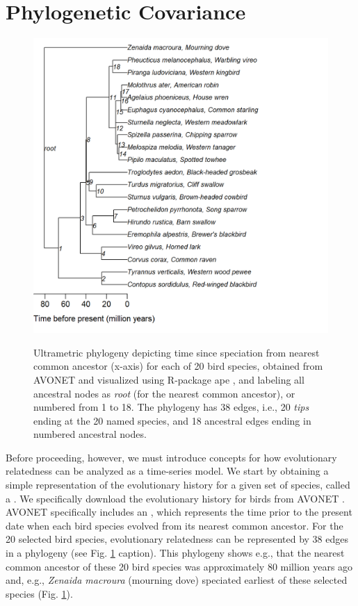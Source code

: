 \section{Phylogenetic Covariance} \label{sec:Chap11_phylogenetic_covariance}

\begin{figure}[!ht]
    \caption[Phylogeny for 20 western US birds]{Ultrametric phylogeny depicting time since speciation from nearest common ancestor (x-axis) for each of 20 bird species, obtained from AVONET \cite{tobias_avonet_2022} and visualized using R-package \colorbox{backcolour}{ape} \cite{paradis_ape_2019}, and labeling all ancestral nodes as \textit{root} (for the nearest common ancestor), or numbered from 1 to 18.  The phylogeny has 38 edges, i.e., 20 \textit{tips} ending at the 20 named species, and 18 ancestral edges ending in numbered ancestral nodes.}
    \includegraphics[width=5.5in]{Chap_11/Phylogeny.png}
    \label{fig:Chap11_phylogeny}
\end{figure}

Before proceeding, however, we must introduce concepts for how evolutionary relatedness can be analyzed as a time-series model.  We start by obtaining a simple representation of the evolutionary history for a given set of species, called a .  We specifically download the evolutionary history for birds from AVONET \cite{hackett_phylogenomic_2008,tobias_avonet_2022}.  AVONET specifically includes an , which represents the time prior to the present date when each bird species evolved from its nearest common ancestor.  For the 20 selected bird species, evolutionary relatedness can be represented by 38 edges in a phylogeny (see Fig. \ref{fig:Chap11_phylogeny} caption).  This phylogeny shows e.g., that the nearest common ancestor of these 20 bird species was approximately 80 million years ago and, e.g., \textit{Zenaida macroura} (mourning dove) speciated earliest of these selected species (Fig. \ref{fig:Chap11_phylogeny}).   

